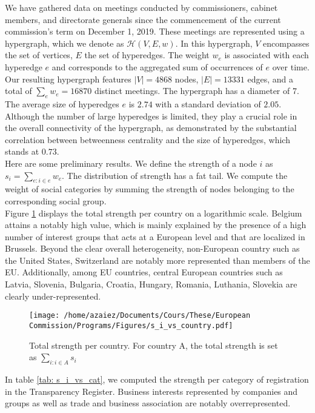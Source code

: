 \documentclass[ 11pt]{article}
\begin{document}
We have gathered data on meetings conducted by commissioners, cabinet members, and directorate generals since the commencement of the current commission's term on December 1, 2019. 
These meetings are represented using a hypergraph, which we denote as $\mathcal{H}(V, E, w)$.
In this hypergraph, $V$ encompasses the set of vertices, $E$ the set of hyperedges. The weight $w_e$ is associated with each hyperedge $e$ and corresponds to the aggregated sum of occurrences of $e$ over time.
Our resulting hypergraph features $|V| = 4868$ nodes, $|E| = 13331$ edges, and a total of $\sum_e w_e = 16870$ distinct meetings. The hypergraph has a diameter of 7.
The average size of hyperedges $e$ is $2.74$ with a standard deviation of $2.05$. 
Although the number of large  hyperedges is limited, they play a crucial role in the overall connectivity of the hypergraph, as demonstrated by the substantial correlation between betweenness centrality and the size of hyperedges, which stands at $0.73$.  \\
Here are some preliminary results. We define the strength of a node $i$ as $s_i = \sum_{e: i \in e} w_e$. The distribution of strength has a fat tail. 
We compute the weight of social categories by summing the strength of nodes belonging to the corresponding social group. \\
Figure \ref{fig: s_i_vs_country} displays the total strength per country on a logarithmic scale. 
Belgium attains a notably high value, which is mainly explained by the presence of a high number of interest groups that acts at a European level and that are localized in Brussels.
Beyond the clear overall heterogeneity, non-European country such as the United States, Switzerland are notably more represented than members of the EU. 
Additionally, among EU countries, central European countries such as Latvia, Slovenia, Bulgaria, Croatia, Hungary, Romania, Luthania, Slovekia are clearly under-represented. 
\\
\begin{figure}
\centering
 \texttt{[image: /home/azaiez/Documents/Cours/These/European Commission/Programs/Figures/s\_i\_vs\_country.pdf]}
 \caption{Total strength per country. For country A, the total strength is set as $\sum_{i : i \in A } s_i$}
  \label{fig: s_i_vs_country}
\end{figure} 
In table \ref{tab: s_i_vs_cat}, we computed the strength per category of registration in the Transparency Register. Business interests represented by companies and groups as well as trade and business association are notably overrepresented.
 
\end{document}
